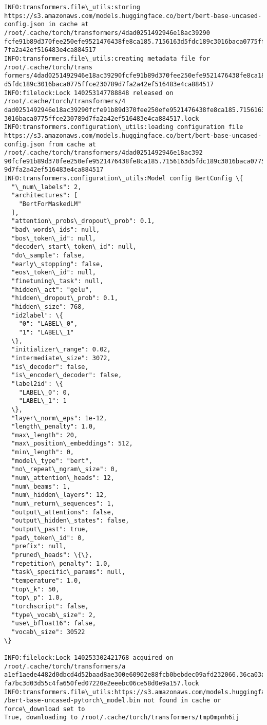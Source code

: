 \documentclass[10pt]{article}
\begin{document}
    
    \begin{Verbatim}[commandchars=\\\{\}]
INFO:transformers.file\_utils:storing
https://s3.amazonaws.com/models.huggingface.co/bert/bert-base-uncased-
config.json in cache at /root/.cache/torch/transformers/4dad0251492946e18ac39290
fcfe91b89d370fee250efe9521476438fe8ca185.7156163d5fdc189c3016baca0775ffce230789d
7fa2a42ef516483e4ca884517
INFO:transformers.file\_utils:creating metadata file for /root/.cache/torch/trans
formers/4dad0251492946e18ac39290fcfe91b89d370fee250efe9521476438fe8ca185.7156163
d5fdc189c3016baca0775ffce230789d7fa2a42ef516483e4ca884517
INFO:filelock:Lock 140253147788848 released on /root/.cache/torch/transformers/4
dad0251492946e18ac39290fcfe91b89d370fee250efe9521476438fe8ca185.7156163d5fdc189c
3016baca0775ffce230789d7fa2a42ef516483e4ca884517.lock
INFO:transformers.configuration\_utils:loading configuration file
https://s3.amazonaws.com/models.huggingface.co/bert/bert-base-uncased-
config.json from cache at /root/.cache/torch/transformers/4dad0251492946e18ac392
90fcfe91b89d370fee250efe9521476438fe8ca185.7156163d5fdc189c3016baca0775ffce23078
9d7fa2a42ef516483e4ca884517
INFO:transformers.configuration\_utils:Model config BertConfig \{
  "\_num\_labels": 2,
  "architectures": [
    "BertForMaskedLM"
  ],
  "attention\_probs\_dropout\_prob": 0.1,
  "bad\_words\_ids": null,
  "bos\_token\_id": null,
  "decoder\_start\_token\_id": null,
  "do\_sample": false,
  "early\_stopping": false,
  "eos\_token\_id": null,
  "finetuning\_task": null,
  "hidden\_act": "gelu",
  "hidden\_dropout\_prob": 0.1,
  "hidden\_size": 768,
  "id2label": \{
    "0": "LABEL\_0",
    "1": "LABEL\_1"
  \},
  "initializer\_range": 0.02,
  "intermediate\_size": 3072,
  "is\_decoder": false,
  "is\_encoder\_decoder": false,
  "label2id": \{
    "LABEL\_0": 0,
    "LABEL\_1": 1
  \},
  "layer\_norm\_eps": 1e-12,
  "length\_penalty": 1.0,
  "max\_length": 20,
  "max\_position\_embeddings": 512,
  "min\_length": 0,
  "model\_type": "bert",
  "no\_repeat\_ngram\_size": 0,
  "num\_attention\_heads": 12,
  "num\_beams": 1,
  "num\_hidden\_layers": 12,
  "num\_return\_sequences": 1,
  "output\_attentions": false,
  "output\_hidden\_states": false,
  "output\_past": true,
  "pad\_token\_id": 0,
  "prefix": null,
  "pruned\_heads": \{\},
  "repetition\_penalty": 1.0,
  "task\_specific\_params": null,
  "temperature": 1.0,
  "top\_k": 50,
  "top\_p": 1.0,
  "torchscript": false,
  "type\_vocab\_size": 2,
  "use\_bfloat16": false,
  "vocab\_size": 30522
\}

INFO:filelock:Lock 140253302421768 acquired on /root/.cache/torch/transformers/a
a1ef1aede4482d0dbcd4d52baad8ae300e60902e88fcb0bebdec09afd232066.36ca03ab34a1a5d5
fa7bc3d03d55c4fa650fed07220e2eeebc06ce58d0e9a157.lock
INFO:transformers.file\_utils:https://s3.amazonaws.com/models.huggingface.co/bert
/bert-base-uncased-pytorch\_model.bin not found in cache or force\_download set to
True, downloading to /root/.cache/torch/transformers/tmp0mpnh6ij
    \end{Verbatim}
\end{document}
